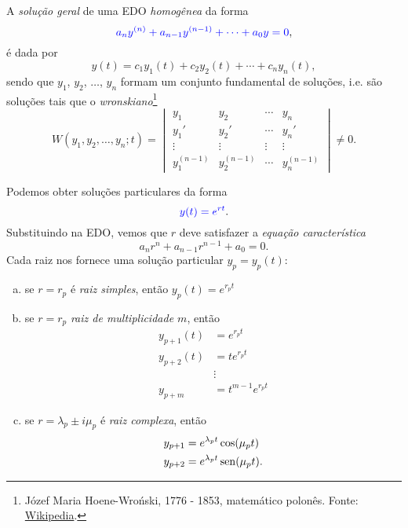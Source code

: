 A \emph{solução geral} de uma EDO \emph{homogênea} da forma
\begin{equation}
  {\color{blue}a_ny^{(n)} + a_{n-1}y^{(n-1)} + \cdots + a_0y = 0},
\end{equation}
é dada por
\begin{equation}
  y(t) = c_1y_1(t) + c_2y_2(t) + \cdots + c_ny_n(t),
\end{equation}
sendo que $y_1$, $y_2$, $\dotsc$, $y_n$ formam um conjunto fundamental de soluções, i.e. são soluções tais que o \emph{wronskiano}\footnote{Józef Maria Hoene-Wroński, 1776 - 1853, matemático polonês. Fonte: \href{https://en.wikipedia.org/w/index.php?title=J\%C3\%B3zef_Maria_Hoene-Wro\%C5\%84ski\&oldid=939986060}{Wikipedia}.}
\begin{equation}
  W(y_1,y_2,\dotsc,y_n;t) =
  \begin{vmatrix}
    y_1 & y_2 & \cdots & y_n \\
    y_1' & y_2' & \cdots & y_n' \\
    \vdots & \vdots & \vdots & \vdots \\
    y_1^{(n-1)} & y_2^{(n-1)} & \cdots & y_n^{(n-1)}
  \end{vmatrix} \neq 0.
\end{equation}


Podemos obter soluções particulares da forma
\begin{equation}
  {\color{blue}y(t) = e^{rt}}.
\end{equation}
Substituindo na EDO, vemos que $r$ deve satisfazer a \emph{equação característica}
\begin{equation}
  a_nr^n + a_{n-1}r^{n-1} + a_0 = 0.
\end{equation}
Cada raiz nos fornece uma solução particular $y_p=y_p(t)$:
\begin{enumerate}[a)]
\item se $r = r_p$ é \emph{raiz simples}, então
  $y_p(t) = e^{r_pt}$
\item se $r = r_p$ \emph{raiz de multiplicidade $m$}, então
  \begin{align}
    y_{p+1}(t) &= e^{r_pt} \\
    y_{p+2}(t) &= te^{r_pt} \\
           &\vdots \\
    y_{p+m} &= t^{m-1}e^{r_pt}
  \end{align}
\item se $r = \lambda_p\pm i\mu_p$ é \emph{raiz complexa}, então
  \begin{align}
    y_{p+1} &= e^{\lambda_pt}\cos(\mu_pt) \\
    y_{p+2} &= e^{\lambda_pt}\operatorname{sen}(\mu_pt).
  \end{align}
\end{enumerate}

